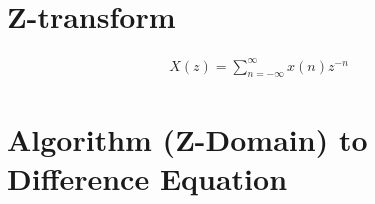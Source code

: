 \documentclass{article}
\newcommand{\sincludepdf}[2][]{
	
}
\begin{document}


\clearpage
\sincludepdf[pages={4},
			pagecommand=\section{Transfer Function (S-Domain) to State Space}\subsection*{Example 1}
		]{scan/11211301.pdf}
\sincludepdf[pages={5}]{scan/11211301.pdf}


\section{Z-transform}

\begin{align}
	X(z) = \sum_{n = -\infty}^{\infty} x(n) z^{-n}
\end{align}

\sincludepdf[pages={6},
		pagecommand=\subsection*{Example 1}
	]{scan/11211301.pdf}

\sincludepdf[pages={7},
		pagecommand=\section{Geometric Series}
	]{scan/11211301.pdf}

\section{Algorithm (Z-Domain) to Difference Equation}

\sincludepdf[pages={11},
			pagecommand=\subsection*{Example 1}
		]{scan/11211301.pdf}

\sincludepdf[pages={12},
			pagecommand=\subsection*{Example 2}
		]{scan/11211301.pdf}
\end{document}
